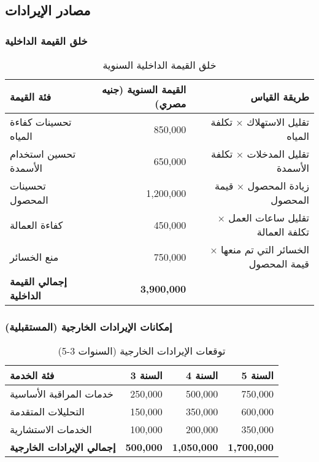 \subsection{مصادر الإيرادات}

\subsubsection{خلق القيمة الداخلية}
\begin{table}[H]
\centering
\begin{tabular}{lrr}
\toprule
\textbf{فئة القيمة} & \textbf{القيمة السنوية (جنيه مصري)} & \textbf{طريقة القياس} \\
\midrule
تحسينات كفاءة المياه & 850,000 & تقليل الاستهلاك × تكلفة المياه \\
تحسين استخدام الأسمدة & 650,000 & تقليل المدخلات × تكلفة الأسمدة \\
تحسينات المحصول & 1,200,000 & زيادة المحصول × قيمة المحصول \\
كفاءة العمالة & 450,000 & تقليل ساعات العمل × تكلفة العمالة \\
منع الخسائر & 750,000 & الخسائر التي تم منعها × قيمة المحصول \\
\midrule
\textbf{إجمالي القيمة الداخلية} & \textbf{3,900,000} & \\
\bottomrule
\end{tabular}
\caption{خلق القيمة الداخلية السنوية}
\end{table}

\subsubsection{إمكانات الإيرادات الخارجية (المستقبلية)}
\begin{table}[H]
\centering
\begin{tabular}{lrrr}
\toprule
\textbf{فئة الخدمة} & \textbf{السنة 3} & \textbf{السنة 4} & \textbf{السنة 5} \\
\midrule
خدمات المراقبة الأساسية & 250,000 & 500,000 & 750,000 \\
التحليلات المتقدمة & 150,000 & 350,000 & 600,000 \\
الخدمات الاستشارية & 100,000 & 200,000 & 350,000 \\
\midrule
\textbf{إجمالي الإيرادات الخارجية} & \textbf{500,000} & \textbf{1,050,000} & \textbf{1,700,000} \\
\bottomrule
\end{tabular}
\caption{توقعات الإيرادات الخارجية (السنوات 3-5)}
\end{table}


